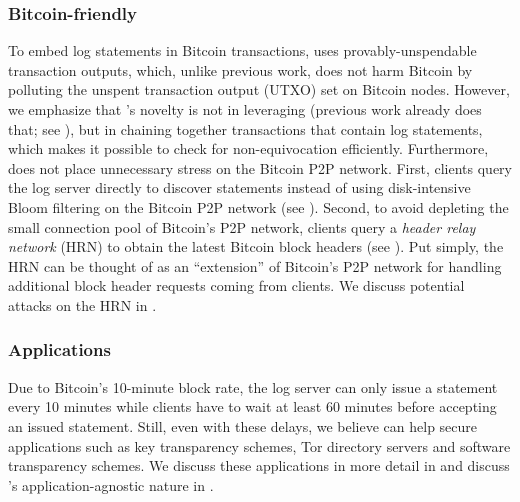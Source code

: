 \subsubsection{Bitcoin-friendly}
To embed log statements in Bitcoin transactions, \Sys uses provably-unspendable \opret transaction outputs\cite{opreturn}, which, unlike previous work\cite{keybase-opret,blockstack}, does not harm Bitcoin by polluting the unspent transaction output (UTXO) set on Bitcoin nodes.
However, we emphasize that \Sys's novelty is not in leveraging \opret (previous work already does that; see ), but in chaining together \opret transactions that contain log statements, which makes it possible to check for non-equivocation efficiently.
Furthermore, \Sys does not place unnecessary stress on the Bitcoin P2P network.
First, clients query the \Sys log server directly to discover statements instead of using disk-intensive Bloom filtering on the Bitcoin P2P network (see ).
Second, to avoid depleting the small connection pool of Bitcoin's P2P network, clients query a \emph{header relay network} (HRN) to obtain the latest Bitcoin block headers (see ).
Put simply, the HRN can be thought of as an ``extension'' of Bitcoin's P2P network for handling additional block header requests coming from \Sys clients.
We discuss potential attacks on the HRN in .

\subsubsection{Applications}
Due to Bitcoin's 10-minute block rate, the \Sys log server can only issue a statement every 10 minutes while clients have to wait at least 60 minutes before accepting an issued statement.
Still, even with these delays, we believe \Sys can help secure applications such as key transparency schemes, Tor directory servers and software transparency schemes.
We discuss these applications in more detail in  and discuss \Sys's application-agnostic nature in .

